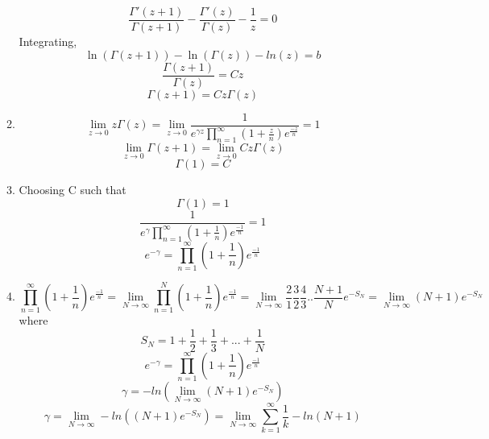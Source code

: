 \documentclass[a4paper]{article}
\begin{document}
\begin{enumerate}
\begin{enumerate}
			\[ \frac{\Gamma'(z+1)}{\Gamma(z+1)} -\frac{\Gamma'(z)}{\Gamma(z)} -\frac{1}{z} =0 \]	
			Integrating,
			\[\ln(\Gamma(z+1))-\ln(\Gamma(z))-ln(z)=b	\] 	   
			\[\frac{\Gamma(z+1)}{\Gamma(z)} = Cz\]   
			\[   \Gamma(z+1)= Cz\Gamma(z) \]  
\item 
\[\lim_{z\to0} z\Gamma(z) = \lim_{z\to 0} \frac{1}{e^{\gamma z} \prod_{n=1}^{\infty} (1+ \frac{z}{n})e^{\frac{-z}{n}} } =1 \]
\[\lim_{z\to0}  \Gamma(z+1)= \lim_{z\to0}  Cz\Gamma(z) \]   
\[ \Gamma(1)=  C \]     
\item
Choosing C such that
 \[ \Gamma(1)=  1 \] 
 \[\frac{1}{e^{\gamma} \prod_{n=1}^{\infty} (1+ \frac{1}{n})e^{\frac{-1}{n}} } =1 \]
 \[e^{-\gamma}   =\prod_{n=1}^{\infty} (1+ \frac{1}{n})e^{\frac{-1}{n}} \]
 \item
    \[\prod_{n=1}^{\infty} (1+ \frac{1}{n})e^{\frac{-1}{n}}=\lim_{N\to \infty}\prod_{n=1}^{N} (1+ \frac{1}{n})e^{\frac{-1}{n}} = \lim_{N\to \infty}\frac{2}{1}\frac{3}{2}\frac{4}{3}..\frac{N+1}{N}e^{-S_N} = \lim_{N\to \infty}(N+1)e^{-S_N} \]     
    where \[S_N = 1+ \frac{1}{2}   + \frac{1}{3} +  ...   + \frac{1}{N}	\]	
     \[e^{-\gamma}   =\prod_{n=1}^{\infty} (1+ \frac{1}{n})e^{\frac{-1}{n}} \]
     \[ \gamma = -ln(\lim_{N\to \infty}(N+1)e^{-S_N})\]
     \[ \gamma =\lim_{N\to \infty} -ln((N+1)e^{-S_N}) =\lim_{N\to \infty}\sum_{k=1}^\infty \frac{1}{k} -ln(N+1)  \] 
\end{enumerate}
	\end{enumerate} 
\end{document}
